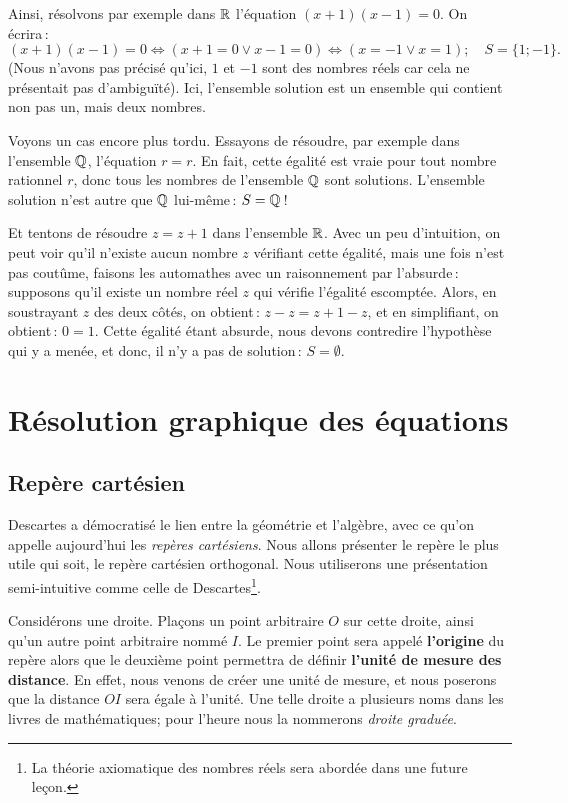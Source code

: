 		Ainsi, résolvons par exemple dans $\mathbb{R}$ l'équation $(x+1)(x-1)=0$. On écrira\,:
		\begin{equation}
			(x+1)(x-1)=0 \Leftrightarrow (x+1=0\lor x-1=0) \Leftrightarrow (x=-1\lor x=1); \quad S=\{1;-1\}.
		\end{equation}
		(Nous n'avons pas précisé qu'ici, $1$ et $-1$ sont des nombres réels car cela ne présentait pas d'ambiguïté). Ici, l'ensemble solution est un ensemble qui contient non pas un, mais deux nombres. 

		Voyons un cas encore plus tordu. Essayons de résoudre, par exemple dans l'ensemble $\mathbb{Q}$, l'équation $r=r$. En fait, cette égalité est vraie pour tout nombre rationnel $r$, donc tous les nombres de l'ensemble $\mathbb{Q}$ sont solutions. L'ensemble solution n'est autre que $\mathbb{Q}$ lui-même\,: $S=\mathbb{Q}$\,!

		Et tentons de résoudre $z=z+1$ dans l'ensemble $\mathbb{R}$. Avec un peu d'intuition, on peut voir qu'il n'existe aucun nombre $z$ vérifiant cette égalité, mais une fois n'est pas coutûme, faisons les automathes avec un raisonnement par l'absurde\,: supposons qu'il existe un nombre réel $z$ qui vérifie l'égalité escomptée. Alors, en soustrayant $z$ des deux côtés, on obtient\,: $z-z = z+1-z$, et en simplifiant, on obtient\,: $0=1$. Cette égalité étant absurde, nous devons contredire l'hypothèse qui y a menée, et donc, il n'y a pas de solution\,: $S=\emptyset$.






\chapter{Résolution graphique des équations}

	\section{Repère cartésien}
		Descartes a démocratisé le lien entre la géométrie et l'algèbre, avec ce qu'on appelle aujourd'hui les \emph{repères cartésiens}. Nous allons  présenter le repère le plus utile qui soit, le repère cartésien orthogonal. Nous utiliserons une présentation semi-intuitive comme celle de Descartes\footnote{La théorie axiomatique des nombres réels sera abordée dans une future leçon.}.

		Considérons une droite. Plaçons un point arbitraire $O$ sur cette droite, ainsi qu'un autre point arbitraire nommé $I$. Le premier point sera appelé {\bfseries l'origine} du repère alors que le deuxième point permettra de définir {\bfseries l'unité de mesure des distance}. En effet, nous venons de créer une unité de mesure, et nous poserons que la distance $OI$ sera égale à l'unité.
		Une telle droite a plusieurs noms dans les livres de mathématiques; pour l'heure nous la nommerons \emph{droite graduée}.

